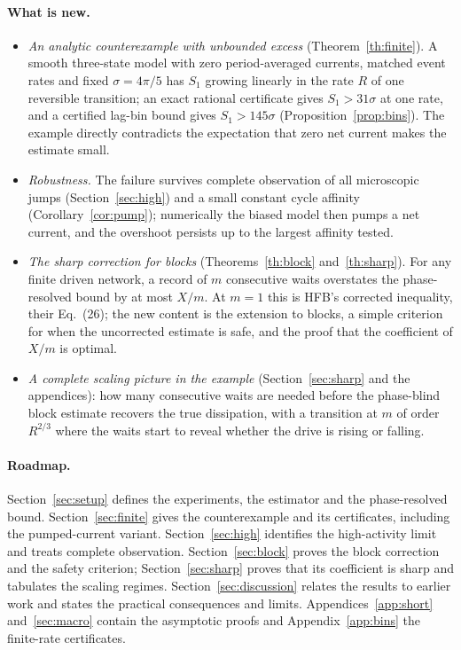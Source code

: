 \documentclass[11pt,a4paper]{article}
\begin{document}
\paragraph{What is new.}
\begin{itemize}
\item \emph{An analytic counterexample with unbounded excess} (Theorem~\ref{th:finite}). A smooth three-state model with zero period-averaged currents, matched event rates and fixed $\sigma=4\pi/5$ has $S_1$ growing linearly in the rate $R$ of one reversible transition; an exact rational certificate gives $S_1>31\sigma$ at one rate, and a certified lag-bin bound gives $S_1>145\sigma$ (Proposition~\ref{prop:bins}). The example directly contradicts the expectation that zero net current makes the estimate small.
\item \emph{Robustness.} The failure survives complete observation of all microscopic jumps (Section~\ref{sec:high}) and a small constant cycle affinity (Corollary~\ref{cor:pump}); numerically the biased model then pumps a net current, and the overshoot persists up to the largest affinity tested.
\item \emph{The sharp correction for blocks} (Theorems~\ref{th:block} and~\ref{th:sharp}). For any finite driven network, a record of $m$ consecutive waits overstates the phase-resolved bound by at most $X/m$. At $m=1$ this is HFB's corrected inequality, their Eq.~(26); the new content is the extension to blocks, a simple criterion for when the uncorrected estimate is safe, and the proof that the coefficient of $X/m$ is optimal.
\item \emph{A complete scaling picture in the example} (Section~\ref{sec:sharp} and the appendices): how many consecutive waits are needed before the phase-blind block estimate recovers the true dissipation, with a transition at $m$ of order $R^{2/3}$ where the waits start to reveal whether the drive is rising or falling.
\end{itemize}

\paragraph{Roadmap.} Section~\ref{sec:setup} defines the experiments, the estimator and the phase-resolved bound. Section~\ref{sec:finite} gives the counterexample and its certificates, including the pumped-current variant. Section~\ref{sec:high} identifies the high-activity limit and treats complete observation. Section~\ref{sec:block} proves the block correction and the safety criterion; Section~\ref{sec:sharp} proves that its coefficient is sharp and tabulates the scaling regimes. Section~\ref{sec:discussion} relates the results to earlier work and states the practical consequences and limits. Appendices~\ref{app:short} and~\ref{sec:macro} contain the asymptotic proofs and Appendix~\ref{app:bins} the finite-rate certificates.
\end{document}
